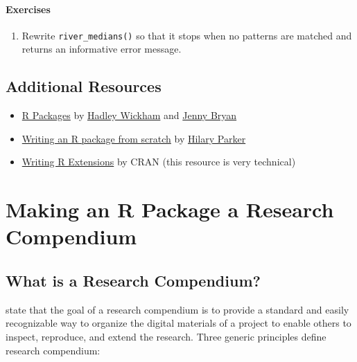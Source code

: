 \documentclass[
]{book}
\providecommand{\tightlist}{%
  \setlength{\itemsep}{0pt}\setlength{\parskip}{0pt}}
\begin{document}
\hypertarget{exercises-4}{%
\subsubsection{Exercises}\label{exercises-4}}

\begin{enumerate}
\def\labelenumi{\arabic{enumi}.}
\tightlist
\item
  Rewrite \texttt{river\_medians()} so that it stops when no patterns are matched and returns an informative error message.
\end{enumerate}

\hypertarget{additional-resources}{%
\section{Additional Resources}\label{additional-resources}}

\begin{itemize}
\tightlist
\item
  \href{https://r-pkgs.org/index.html}{R Packages} by \href{http://hadley.nz/}{Hadley Wickham} and \href{https://jennybryan.org/}{Jenny Bryan}
\item
  \href{https://hilaryparker.com/2014/04/29/writing-an-r-package-from-scratch/}{Writing an R package from scratch} by \href{https://hilaryparker.com/}{Hilary Parker}
\item
  \href{https://cran.r-project.org/doc/manuals/r-release/R-exts.html}{Writing R Extensions} by CRAN (this resource is very technical)
\end{itemize}

\hypertarget{r-package-research-compendium}{%
\chapter{Making an R Package a Research Compendium}\label{r-package-research-compendium}}

\hypertarget{what-is-a-research-compendium}{%
\section{What is a Research Compendium?}\label{what-is-a-research-compendium}}

\citet{marwick2018packaging} state that the goal of a research compendium is to provide a standard and easily recognizable way to organize the digital materials of a project to enable others to inspect, reproduce, and extend the research. Three generic principles define research compendium:
\end{document}
